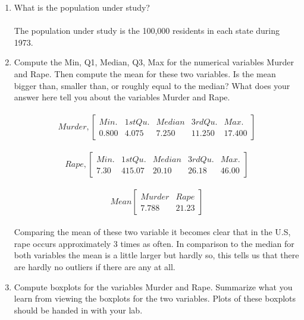 \documentclass{report}
\begin{document}
\begin{enumerate}

\item What is the population under study?\\\\
The population under study is the 100,000 residents in each state during 1973.

\item Compute the Min, Q1, Median, Q3, Max for the numerical variables
Murder and Rape.  Then compute the mean for these two variables.  Is
the mean bigger than, smaller than, or roughly equal to the median?
What does your answer here tell you about the variables Murder and
Rape.\\\\
\begin{equation}
Murder, 
\begin{bmatrix}
Min.&1st Qu.&Median&3rd Qu.&Max.\\ 
 0.800&4.075&7.250&11.250&17.400 
\end{bmatrix}
\end{equation}
\\
\begin{equation}
Rape, 
\begin{bmatrix}
Min.&1st Qu.&Median&3rd Qu.&Max.\\ 
 7.30&415.07&20.10&26.18&46.00
\end{bmatrix}
\end{equation}
\\
\begin{equation}
Mean
\begin{bmatrix}
Murder&Rape\\ 
 7.788&21.23
\end{bmatrix}
\end{equation}
\\
Comparing the mean of these two variable it becomes clear that in the U.S, rape occurs approximately 3 times as often. In comparison to the median for both variables the mean is a little larger but hardly so, this tells us that there are hardly no outliers if there are any at all.





\item Compute boxplots for the variables Murder and Rape.  Summarize what
you learn from viewing the boxplots for the two variables.  Plots of these boxplots
should be handed in with your lab.\\\\


\end{enumerate}
\end{document}
